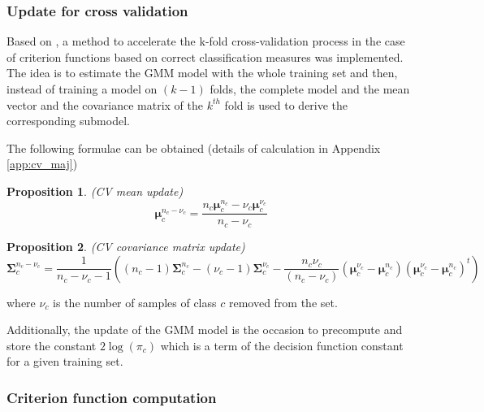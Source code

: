 \documentclass[a4paper,11pt,DIV=16]{scrartcl}
\newtheorem{prop}{Proposition}
\begin{document}
        \subsubsection{Update for cross validation}
        \label{sec:update-cv}

        Based on \cite{fauvel2015fast}, a method to accelerate the k-fold cross-validation process in the case of criterion functions based on correct classification measures was implemented. The idea is to estimate the GMM model with the whole training set and then, instead of training a model on $(k-1)$ folds, the complete model and the mean vector and the covariance matrix of the $k^{th}$ fold is used to derive the corresponding submodel.

        The following formulae can be obtained (details of calculation in Appendix \ref{app:cv_maj})
        \begin{prop}
            \label{eq:update-cv1}
            (CV mean update)
            \begin{equation*}
                \boldsymbol{\mu}_c^{n_c-\nu_c} = \frac{n_c \boldsymbol{\mu}_c^{n_c} - \nu_c \boldsymbol{\mu}_c^{\nu_c}}{n_c - \nu_c} \nonumber
            \end{equation*}
        \end{prop}
        \begin{prop}
            \label{eq:update-cv2}
            (CV covariance matrix update)
            \begin{equation*}
                \boldsymbol{\Sigma}_c^{n_c-\nu_c} = \frac{1}{n_c-\nu_c-1} ( (n_c-1) \boldsymbol{\Sigma}_c^{n_c} - (\nu_c-1) \boldsymbol{\Sigma}_c^{\nu_c} - \frac{n_c \nu_c}{(n_c-\nu_c)} (\boldsymbol{\mu}_c^{\nu_c}-\boldsymbol{\mu}_c^{n_c})(\boldsymbol{\mu}_c^{\nu_c}-\boldsymbol{\mu}_c^{n_c})^t) \nonumber
            \end{equation*}
        \end{prop}
        where $\nu_c$ is the number of samples of class $c$ removed from the set.

        Additionally, the update of the GMM model is the occasion to precompute and store the constant $2 \log (\pi_c)$ which is a term of the decision function constant for a given training set.

        \subsubsection{Criterion function computation}
        \label{sec:update-crit}
\end{document}

